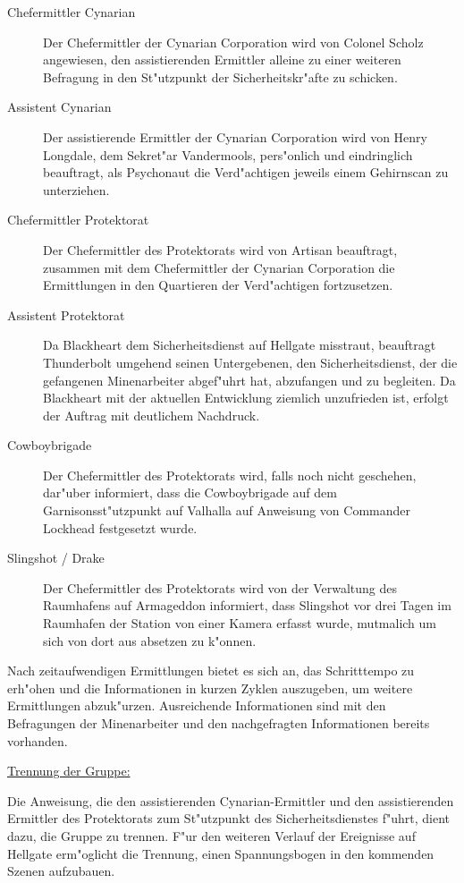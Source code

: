 \begin{description}
	\item[Chefermittler Cynarian] Der Chefermittler der Cynarian Corporation wird von Colonel Scholz angewiesen, den assistierenden 
		Ermittler alleine zu einer weiteren Befragung in den St"utzpunkt der Sicherheitskr"afte zu schicken. 
	\item[Assistent Cynarian] Der assistierende Ermittler der Cynarian Corporation wird von Henry Longdale, dem Sekret"ar Vandermools, 
		pers"onlich und eindringlich beauftragt, als Psychonaut die Verd"achtigen jeweils einem Gehirnscan zu unterziehen.
	\item[Chefermittler Protektorat] Der Chefermittler des Protektorats wird von Artisan beauftragt, zusammen mit dem Chefermittler der 
		Cynarian Corporation die Ermittlungen in den Quartieren der Verd"achtigen fortzusetzen. 
	\item[Assistent Protektorat] Da Blackheart dem Sicherheitsdienst auf Hellgate misstraut, beauftragt Thunderbolt umgehend seinen 
		Untergebenen, den Sicherheitsdienst, der die gefangenen Minenarbeiter abgef"uhrt hat, abzufangen und zu begleiten. Da Blackheart mit der aktuellen Entwicklung ziemlich unzufrieden ist, erfolgt der Auftrag mit deutlichem Nachdruck. 
	\item[Cowboybrigade] Der Chefermittler des Protektorats wird, falls noch nicht geschehen, dar"uber informiert, dass die Cowboybrigade 
		auf dem Garnisonsst"utzpunkt auf Valhalla auf Anweisung von Commander Lockhead festgesetzt wurde.
	\item[Slingshot / Drake] Der Chefermittler des Protektorats wird von der Verwaltung des Raumhafens auf Armageddon informiert, dass 
		Slingshot vor drei Tagen im Raumhafen der Station von einer Kamera erfasst wurde, mutma\3lich um sich von dort aus absetzen zu k"onnen.
\end{description}

\begin{remarks}
	Nach zeitaufwendigen Ermittlungen bietet es sich an, das Schritttempo zu erh"ohen und die Informationen in kurzen Zyklen auszugeben, um weitere Ermittlungen abzuk"urzen. Ausreichende Informationen sind mit den Befragungen der Minenarbeiter und den nachgefragten Informationen bereits vorhanden.

	\underline{Trennung der Gruppe:}

	Die Anweisung, die den assistierenden Cynarian-Ermittler und den assistierenden Ermittler des Protektorats zum St"utzpunkt des Sicherheitsdienstes f"uhrt, dient dazu, die Gruppe zu trennen. F"ur den weiteren Verlauf der Ereignisse auf Hellgate erm"oglicht die Trennung, einen Spannungsbogen in den kommenden Szenen aufzubauen.
\end{remarks}

